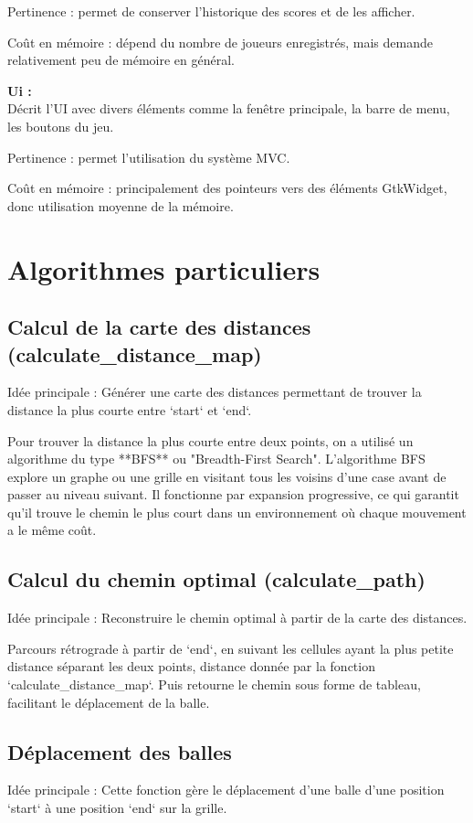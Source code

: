 \documentclass[a4paper, 11pt, oneside]{article}
\begin{document}
Pertinence : permet de conserver l'historique des scores et de les afficher.

Coût en mémoire : dépend du nombre de joueurs enregistrés, mais demande relativement peu de mémoire en général.

\textbf{Ui :}\\
Décrit l’UI avec divers éléments comme la fenêtre principale, la barre de menu, les boutons du jeu.

Pertinence : permet l'utilisation du système MVC.

Coût en mémoire : principalement des pointeurs vers des éléments GtkWidget, donc utilisation moyenne de la mémoire.

\section{Algorithmes particuliers}

\subsection{Calcul de la carte des distances (calculate\_distance\_map)}
Idée principale : Générer une carte des distances permettant de trouver la distance la plus courte entre `start` et `end`.

Pour trouver la distance la plus courte entre deux points, on a utilisé un algorithme du type **BFS** ou "Breadth-First Search".
L’algorithme BFS explore un graphe ou une grille en visitant tous les voisins d’une case avant de passer au niveau suivant.
Il fonctionne par expansion progressive, ce qui garantit qu’il trouve le chemin le plus court dans un environnement où chaque mouvement a le même coût.

\subsection{Calcul du chemin optimal (calculate\_path)}
Idée principale : Reconstruire le chemin optimal à partir de la carte des distances.

Parcours rétrograde à partir de `end`, en suivant les cellules ayant la plus petite distance séparant les deux points,
distance donnée par la fonction `calculate\_distance\_map`.
Puis retourne le chemin sous forme de tableau, facilitant le déplacement de la balle.

\subsection{Déplacement des balles}
Idée principale : Cette fonction gère le déplacement d'une balle d'une position `start` à une position `end` sur la grille.
\end{document}
